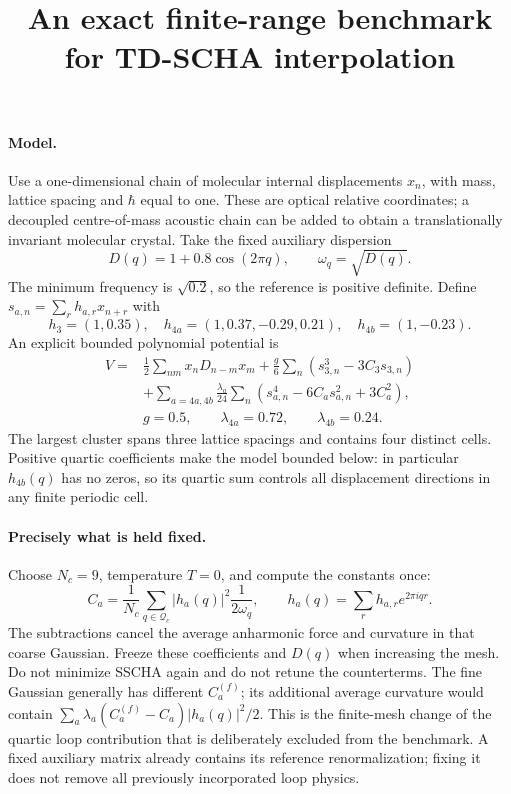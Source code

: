 \documentclass[11pt]{article}
\title{An exact finite-range benchmark for TD-SCHA interpolation}
\author{}
\date{}
\begin{document}
\maketitle

\paragraph{Model.}
Use a one-dimensional chain of molecular internal displacements $x_n$,
with mass, lattice spacing and $\hbar$ equal to one. These are optical
relative coordinates; a decoupled centre-of-mass acoustic chain can be
added to obtain a translationally invariant molecular crystal.
Take the fixed auxiliary dispersion
\[
 D(q)=1+0.8\cos(2\pi q),\qquad \omega_q=\sqrt{D(q)}.
\]
The minimum frequency is $\sqrt{0.2}$, so the reference is positive definite.
Define $s_{a,n}=\sum_r h_{a,r}x_{n+r}$ with
\[
 h_3=(1,0.35),\quad h_{4a}=(1,0.37,-0.29,0.21),
 \quad h_{4b}=(1,-0.23).
\]
An explicit bounded polynomial potential is
\begin{align*}
 V={}&\frac12\sum_{nm}x_nD_{n-m}x_m
 +\frac{g}{6}\sum_n(s_{3,n}^3-3C_3s_{3,n})\\
 &+\sum_{a=4a,4b}\frac{\lambda_a}{24}
 \sum_n(s_{a,n}^4-6C_as_{a,n}^2+3C_a^2),\\
 &g=0.5,\qquad \lambda_{4a}=0.72,\qquad\lambda_{4b}=0.24.
\end{align*}
The largest cluster spans three lattice spacings and contains four
distinct cells. Positive quartic coefficients make the model bounded
below: in particular $h_{4b}(q)$ has no zeros, so its quartic sum controls
all displacement directions in any finite periodic cell.

\paragraph{Precisely what is held fixed.}
Choose $N_c=9$, temperature $T=0$, and compute the constants once:
\[
 C_a=\frac1{N_c}\sum_{q\in\mathcal Q_c}
 |h_a(q)|^2\frac{1}{2\omega_q},\qquad
 h_a(q)=\sum_r h_{a,r}e^{2\pi iqr}.
\]
The subtractions cancel the average anharmonic force and curvature in
that coarse Gaussian. Freeze these coefficients and $D(q)$ when increasing
the mesh. Do not minimize SSCHA again and do not retune the counterterms.
The fine Gaussian generally has different $C_a^{(f)}$; its additional
average curvature would contain
$\sum_a\lambda_a(C_a^{(f)}-C_a)|h_a(q)|^2/2$.
This is the finite-mesh change of the quartic loop contribution that is
deliberately excluded from the benchmark. A fixed auxiliary matrix already
contains its reference renormalization; fixing it does not remove all
previously incorporated loop physics.
\end{document}
